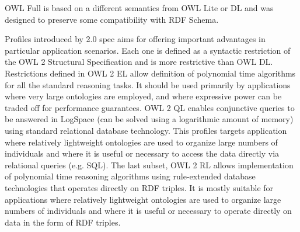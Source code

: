 OWL Full is based on a different semantics from OWL Lite or DL and was designed to preserve some compatibility with RDF Schema. 

Profiles introduced by 2.0 spec aims for offering important advantages in particular application scenarios. Each one is defined as a syntactic restriction of the OWL 2 Structural Specification and is more restrictive than OWL DL. Restrictions defined in OWL 2 EL allow definition of polynomial time algorithms for all the standard reasoning tasks. It should be used primarily by applications where very large ontologies are employed, and where expressive power can be traded off for performance guarantees. OWL 2 QL enables conjunctive queries to be answered in LogSpace (can be solved using a logarithmic amount of memory) using standard relational database technology. This profiles targets application where relatively lightweight ontologies are used to organize large numbers of individuals and where it is useful or necessary to access the data directly via relational queries (e.g. SQL). The last subset, OWL 2 RL allows implementation of polynomial time reasoning algorithms using rule-extended database technologies that operates directly on RDF triples. It is mostly suitable for applications where relatively lightweight ontologies are used to organize large numbers of individuals and where it is useful or necessary to operate directly on data in the form of RDF triples.
